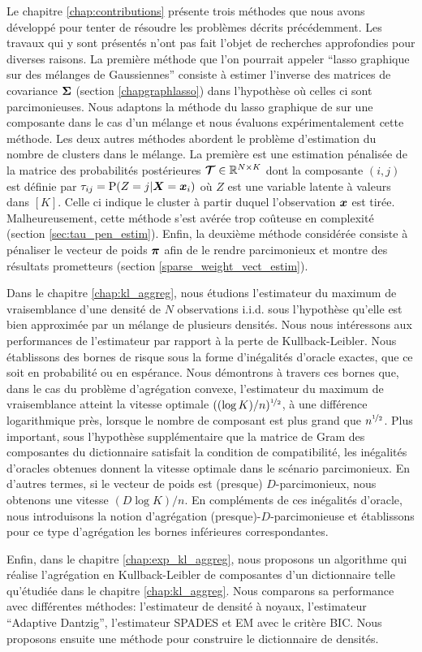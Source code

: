 Le chapitre \ref{chap:contributions} présente trois méthodes que nous avons développé pour tenter de résoudre les problèmes décrits précédemment. Les travaux qui y sont présentés n'ont pas fait l'objet de recherches approfondies pour diverses raisons. La première méthode que l'on pourrait appeler ``lasso graphique sur des mélanges de Gaussiennes'' consiste à estimer l'inverse des matrices de covariance $\boldsymbol\Sigma$ (section \ref{chapgraphlasso}) dans l'hypothèse où celles ci sont parcimonieuses. Nous adaptons la méthode du lasso graphique de \citep{glasso07} sur une composante dans le cas d'un mélange et nous évaluons expérimentalement cette méthode. Les deux autres méthodes abordent le problème d'estimation du nombre de clusters dans le mélange. La première est une estimation pénalisée de la matrice des probabilités postérieures $\boldsymbol{\mathcal T}\in{\mathbb R}^{N\times K}$ dont la composante $(i,j)$ est définie par $\tau_{ij}=\textnormal{P}(Z=j|\boldsymbol X=\boldsymbol x_i)$ où $Z$ est une variable latente à valeurs dans $[K]$. Celle ci indique le cluster à partir duquel l'observation $\boldsymbol x$ est tirée. Malheureusement, cette méthode s'est avérée trop coûteuse en complexité (section \ref{sec:tau_pen_estim}). Enfin, la deuxième méthode considérée consiste à pénaliser le vecteur de poids $\boldsymbol \pi$ afin de le rendre parcimonieux et montre des résultats prometteurs (section \ref{sparse_weight_vect_estim}).

Dans le chapitre \ref{chap:kl_aggreg}, nous étudions l'estimateur du maximum de vraisemblance d'une densité de $N$ observations i.i.d. sous l’hypothèse qu'elle est bien approximée par un mélange de plusieurs densités. Nous nous intéressons aux performances de l'estimateur par rapport à la perte de Kullback-Leibler. Nous établissons des bornes de risque sous la forme d'inégalités d'oracle exactes, que ce soit en probabilité ou en espérance. Nous démontrons à travers ces bornes que, dans le cas du problème d’agrégation convexe, l'estimateur du maximum de vraisemblance atteint la vitesse optimale $((\log K)/n)^{\nicefrac12}$, à une différence logarithmique près, lorsque le nombre de composant est plus grand que $n^{\nicefrac12}$. Plus important, sous l’hypothèse supplémentaire que la matrice de Gram des composantes du dictionnaire satisfait la condition de compatibilité, les inégalités d'oracles obtenues donnent la vitesse optimale dans le scénario parcimonieux. En d'autres termes, si le vecteur de poids est (presque) $D$-parcimonieux, nous obtenons une vitesse $(D\log K)/n$. En compléments de ces inégalités d'oracle, nous introduisons la notion d’agrégation (presque)-$D$-parcimonieuse et établissons pour ce type d’agrégation les bornes inférieures correspondantes.

Enfin, dans le chapitre \ref{chap:exp_kl_aggreg}, nous proposons un algorithme qui réalise l'agrégation en Kullback-Leibler de composantes d'un dictionnaire telle qu'étudiée dans le chapitre \ref{chap:kl_aggreg}. Nous comparons sa performance avec différentes méthodes: l'estimateur de densité à noyaux, l'estimateur ``Adaptive Dantzig'', l'estimateur SPADES et EM avec le critère BIC. Nous proposons ensuite une méthode pour construire le dictionnaire de densités.
